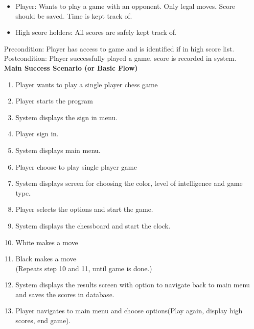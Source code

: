 \documentclass{article}
\begin{document}
\begin{flushleft}
\begin{itemize}	
	\item Player: Wants to play a game with an opponent. Only legal moves. Score should be saved. Time is kept track of.\\	
	\item High score holders: All scores are safely kept track of.	
\end{itemize}

	Precondition: Player has access to game and is identified if in high score list.\\
	\vspace{1mm}
	Postcondition: Player successfully played a game, score is recorded in system.\\
	\vspace{2mm}
	\textbf{Main Success Scenario (or Basic Flow)}\\

\begin{enumerate}	
\item	 Player wants to play a single player chess game
\item 	 Player starts the program
\item 	 System displays the sign in menu.
\item 	 Player sign in.
\item    System displays main menu.
\item    Player choose to play single player game
\item 	 System displays screen for choosing the color, level of intelligence and game type.
\item    Player selects the options and start the game.
\item    System displays the chessboard and start the clock. 
\item 	 White makes a move
\item	 Black makes a move\\
(Repeats step 10 and 11, until game is done.)
\item    System displays the results screen with option to navigate back to main menu and saves the scores in database.
\item 	 Player navigates to main menu and choose options(Play again, display high scores, end game).
\end{enumerate}


\end{flushleft}
\end{document}
